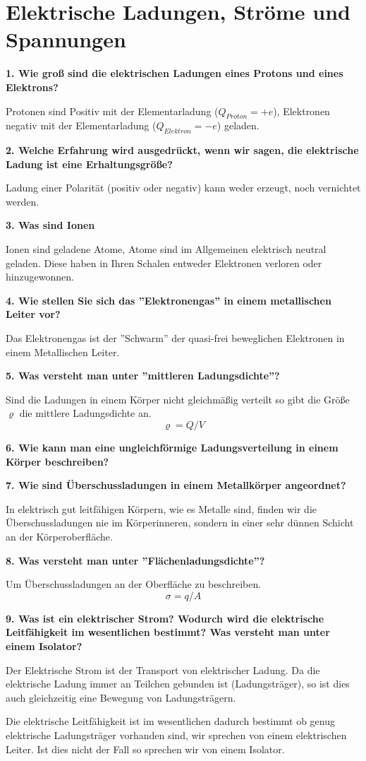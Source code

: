 \documentclass[12pt,a4paper,twoside]{book}
\newcommand{\nqu}[1]{\vspace*{10mm} \noindent \textbf{#1} \par \vspace*{1mm}}
\begin{document}

\chapter{Elektrische Ladungen, Ströme und Spannungen}

\nqu{1. Wie groß sind die elektrischen Ladungen eines Protons und eines Elektrons?}
Protonen sind Positiv mit der Elementarladung ($Q_{Proton}=+e$), Elektronen negativ mit der Elementarladung ($Q_{Elektron}=-e$) geladen.

\nqu{2. Welche Erfahrung wird ausgedrückt, wenn wir sagen, die elektrische Ladung ist eine Erhaltungsgröße?}
Ladung einer Polarität (positiv oder negativ) kann weder erzeugt, noch vernichtet werden.

\nqu{3. Was sind Ionen}
Ionen sind geladene Atome, Atome sind im Allgemeinen elektrisch neutral geladen. Diese haben in Ihren Schalen entweder Elektronen verloren oder hinzugewonnen.

\nqu{4. Wie stellen Sie sich das ''Elektronengas'' in einem metallischen Leiter vor?}
Das Elektronengas ist der ''Schwarm'' der quasi-frei beweglichen Elektronen in einem Metallischen Leiter.

\nqu{5. Was versteht man unter ''mittleren Ladungsdichte''?}
Sind die Ladungen in einem Körper nicht gleichmäßig verteilt so gibt die Größe $\varrho$ die mittlere Ladungsdichte an.
\[\varrho = Q/V\]

\nqu{6. Wie kann man eine ungleichförmige Ladungsverteilung in einem Körper beschreiben?}

\nqu{7. Wie sind Überschussladungen in einem Metallkörper angeordnet?}
In elektrisch gut leitfähigen Körpern, wie es Metalle sind, finden wir die Überschussladungen nie im Körperinneren, sondern in einer sehr dünnen Schicht an der Körperoberfläche.

\nqu{8. Was versteht man unter ''Flächenladungsdichte''?}
Um Überschussladungen an der Oberfläche zu beschreiben.
\[\sigma=q/A\]

\nqu{9. Was ist ein elektrischer Strom? Wodurch wird die elektrische Leitfähigkeit im wesentlichen bestimmt? Was versteht man unter einem Isolator?}
Der Elektrische Strom ist der Transport von elektrischer Ladung. Da die elektrische Ladung immer an Teilchen gebunden ist (Ladungsträger), so ist dies auch gleichzeitig eine Bewegung von Ladungsträgern.

Die elektrische Leitfähigkeit ist im wesentlichen dadurch bestimmt ob genug elektrische Ladungsträger vorhanden sind, wir sprechen von einem elektrischen Leiter. Ist dies nicht der Fall so sprechen wir von einem Isolator.
\end{document}
